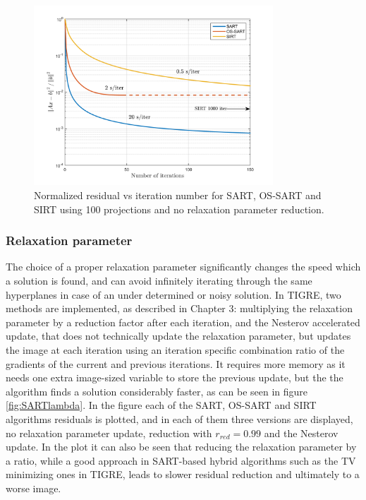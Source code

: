 \begin{figure}[H]
\begin{center}

\includegraphics[width=0.8\textwidth]{Applications/SARTtypes.png} 
\end{center}

\caption[Nomralized residual vs iteration of SART/OS-SART/SIRT]{\label{fig:SARTtypesconv} Normalized residual vs iteration number for SART, OS-SART and SIRT using 100 projections and no relaxation parameter reduction.} 
\end{figure}

\subsubsection{Relaxation parameter}
The choice of a proper relaxation parameter significantly changes the speed which a solution is found, and can avoid infinitely iterating through the same hyperplanes in case of an under determined or noisy solution. In TIGRE, two methods are implemented, as described in Chapter 3: multiplying the relaxation parameter by a reduction factor after each iteration, and the Nesterov accelerated update, that does not technically update the relaxation parameter, but updates the image at each iteration using an iteration specific combination ratio of the gradients of the current and previous iterations. It requires more memory as it needs one extra image-sized variable to store the previous update, but the the algorithm finds a solution considerably faster, as can be seen in figure \ref{fig:SARTlambda}. In the figure each of the SART, OS-SART and SIRT algorithms residuals is plotted, and in each of them three versions are displayed, no relaxation parameter update, reduction with $r_{red}=0.99$ and the Nesterov update. In the plot it can also be seen that reducing the relaxation parameter by a ratio, while a good approach in SART-based hybrid algorithms such as the TV minimizing ones in TIGRE, leads to slower residual reduction and ultimately to a worse image.

